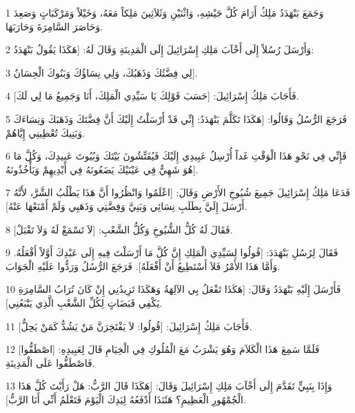 \par 1 وَجَمَعَ بَنْهَدَدُ مَلِكُ أَرَامَ كُلَّ جَيْشِهِ، وَاثْنَيْنِ وَثَلاَثِينَ مَلِكاً مَعَهُ، وَخَيْلاً وَمَرْكَبَاتٍ وَصَعِدَ وَحَاصَرَ السَّامِرَةَ وَحَارَبَهَا.
\par 2 وَأَرْسَلَ رُسُلاً إِلَى أَخْآبَ مَلِكِ إِسْرَائِيلَ إِلَى الْمَدِينَةِ وَقَالَ لَهُ: [هَكَذَا يَقُولُ بَنْهَدَدُ:
\par 3 لِي فِضَّتُكَ وَذَهَبُكَ، وَلِي نِسَاؤُكَ وَبَنُوكَ الْحِسَانُ].
\par 4 فَأَجَابَ مَلِكُ إِسْرَائِيلَ: [حَسَبَ قَوْلِكَ يَا سَيِّدِي الْمَلِكَ، أَنَا وَجَمِيعُ مَا لِي لَكَ].
\par 5 فَرَجَعَ الرُّسُلُ وَقَالُوا: [هَكَذَا تَكَلَّمَ بَنْهَدَدُ: إِنِّي قَدْ أَرْسَلْتُ إِلَيْكَ أَنَّ فِضَّتَكَ وَذَهَبَكَ وَنِسَاءَكَ وَبَنِيكَ تُعْطِينِي إِيَّاهُمْ.
\par 6 فَإِنِّي فِي نَحْوِ هَذَا الْوَقْتِ غَداً أُرْسِلُ عَبِيدِي إِلَيْكَ فَيُفَتِّشُونَ بَيْتَكَ وَبُيُوتَ عَبِيدِكَ، وَكُلَّ مَا هُوَ شَهِيٌّ فِي عَيْنَيْكَ يَضَعُونَهُ فِي أَيْدِيهِمْ وَيَأْخُذُونَهُ].
\par 7 فَدَعَا مَلِكُ إِسْرَائِيلَ جَمِيعَ شُيُوخِ الأَرْضِ وَقَالَ: [اعْلَمُوا وَانْظُرُوا أَنَّ هَذَا يَطْلُبُ الشَّرَّ، لأَنَّهُ أَرْسَلَ إِلَيَّ بِطَلَبِ نِسَائِي وَبَنِيَّ وَفِضَّتِي وَذَهَبِي وَلَمْ أَمْنَعْهَا عَنْهُ].
\par 8 فَقَالَ لَهُ كُلُّ الشُّيُوخِ وَكُلُّ الشَّعْبِ: [لاَ تَسْمَعْ لَهُ وَلاَ تَقْبَلْ].
\par 9 فَقَالَ لِرُسُلِ بَنْهَدَدَ: [قُولُوا لِسَيِّدِي الْمَلِكِ إِنَّ كُلَّ مَا أَرْسَلْتَ فِيهِ إِلَى عَبْدِكَ أَوَّلاً أَفْعَلُهُ. وَأَمَّا هَذَا الأَمْرُ فَلاَ أَسْتَطِيعُ أَنْ أَفْعَلَهُ]. فَرَجَعَ الرُّسُلُ وَرَدُّوا عَلَيْهِ الْجَوَابَ.
\par 10 فَأَرْسَلَ إِلَيْهِ بَنْهَدَدُ وَقَالَ: [هَكَذَا تَفْعَلُ بِي الآلِهَةُ وَهَكَذَا تَزِيدُنِي إِنْ كَانَ تُرَابُ السَّامِرَةِ يَكْفِي قَبَضَاتٍ لِكُلِّ الشَّعْبِ الَّذِي يَتْبَعُنِي].
\par 11 فَأَجَابَ مَلِكُ إِسْرَائِيلَ: [قُولُوا: لاَ يَفْتَخِرَنَّ مَنْ يَشُدُّ كَمَنْ يَحِلُّ].
\par 12 فَلَمَّا سَمِعَ هَذَا الْكَلاَمَ وَهُوَ يَشْرَبُ مَعَ الْمُلُوكِ فِي الْخِيَامِ قَالَ لِعَبِيدِهِ: [اصْطَفُّوا] فَاصْطَفُّوا عَلَى الْمَدِينَةِ.
\par 13 وَإِذَا بِنَبِيٍّ تَقَدَّمَ إِلَى أَخْآبَ مَلِكِ إِسْرَائِيلَ وَقَالَ: [هَكَذَا قَالَ الرَّبُّ: هَلْ رَأَيْتَ كُلَّ هَذَا الْجُمْهُورِ الْعَظِيمِ؟ هَئَنَذَا أَدْفَعُهُ لِيَدِكَ الْيَوْمَ فَتَعْلَمُ أَنِّي أَنَا الرَّبُّ].
